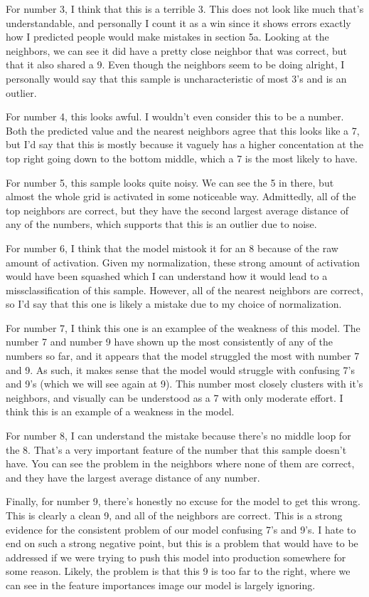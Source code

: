 \documentclass[12pt]{article}
\begin{document}
For number 3, I think that this is a terrible 3. This does not look like much that's understandable, and personally I count 
it as a win since it shows errors exactly how I predicted people would make mistakes in section 5a. Looking at the neighbors,
we can see it did have a pretty close neighbor that was correct, but that it also shared a 9. Even though the neighbors seem 
to be doing alright, I personally would say that this sample is uncharacteristic of most 3's and is an outlier.

For number 4, this looks awful. I wouldn't even consider this to be a number. Both the predicted value and the nearest 
neighbors agree that this looks like a 7, but I'd say that this is mostly because it vaguely has a higher concentation 
at the top right going down to the bottom middle, which a 7 is the most likely to have.

For number 5, this sample looks quite noisy. We can see the 5 in there, but almost the whole grid is activated in some 
noticeable way. Admittedly, all of the top neighbors are correct, but they have the second largest average distance 
of any of the numbers, which supports that this is an outlier due to noise.

For number 6, I think that the model mistook it for an 8 because of the raw amount of activation. Given my normalization, 
these strong amount of activation would have been squashed which I can understand how it would lead to a missclassification 
of this sample. However, all of the nearest neighbors are correct, so I'd say that this one is likely a mistake due to my choice
of normalization.

For number 7, I think this one is an examplee of the weakness of this model. The number 7 and number 9 have shown up the 
most consistently of any of the numbers so far, and it appears that the model struggled the most with number 7 and 9. 
As such, it makes sense that the model would struggle with confusing 7's and 9's (which we will see again at 9).
This number most closely clusters with it's neighbors, and visually can be understood as a 7 with only moderate effort.
I think this is an example of a weakness in the model.

For number 8, I can understand the mistake because there's no middle loop for the 8. That's a very important feature of 
the number that this sample doesn't have. You can see the problem in the neighbors where none of them are correct, 
and they have the largest average distance of any number.

Finally, for number 9, there's honestly no excuse for the model to get this wrong. This is clearly a clean 9, and all of 
the neighbors are correct. This is a strong evidence for the consistent problem of our model confusing 7's and 9's. I 
hate to end on such a strong negative point, but this is a problem that would have to be addressed if we were trying to 
push this model into production somewhere for some reason. Likely, the problem is that this 9 is too far to the right,
where we can see in the feature importances image our model is largely ignoring. 
\end{document}
